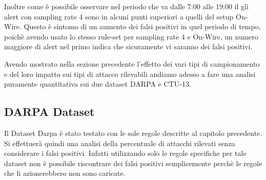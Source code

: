 \documentclass[12pt,a4paper,openright,twoside]{report}
\begin{document}
Inoltre come \`e possibile osservare nel periodo che va dalle 7:00 alle 19:00 il gli alert
con sampling rate 4 sono in alcuni punti superiori a quelli del setup On-Wire. Questo
\`e sintomo di un aumento dei falsi positivi in quel periodo di tempo, poich\`e avendo usato
lo stesso rule-set per sampling rate 4 e On-Wire, un numero maggiore di alert nel primo
indica che sicuramente vi saranno dei falsi positivi.





\clearpage

Avendo mostrato nella sezione precedente l'effetto dei vari tipi di campionamento
e del loro impatto sui tipi di attacco rilevabili andiamo adesso a fare una analisi
puramente quantitativa sui due dataset DARPA e CTU-13.


\subsection{DARPA Dataset}

Il Dataset Darpa \`e stato testato con le sole regole descritte al capitolo precedente.
Si effettuer\`a quindi una analisi della percentuale di attacchi rilevati senza considerare i
falsi positivi. Infatti utilizzando solo le regole specifiche per tale dataset non
\`e possibile riscontrare dei falsi positivi semplicemente perch\`e le regole che li azionerebbero
non sono caricate.
\end{document}
